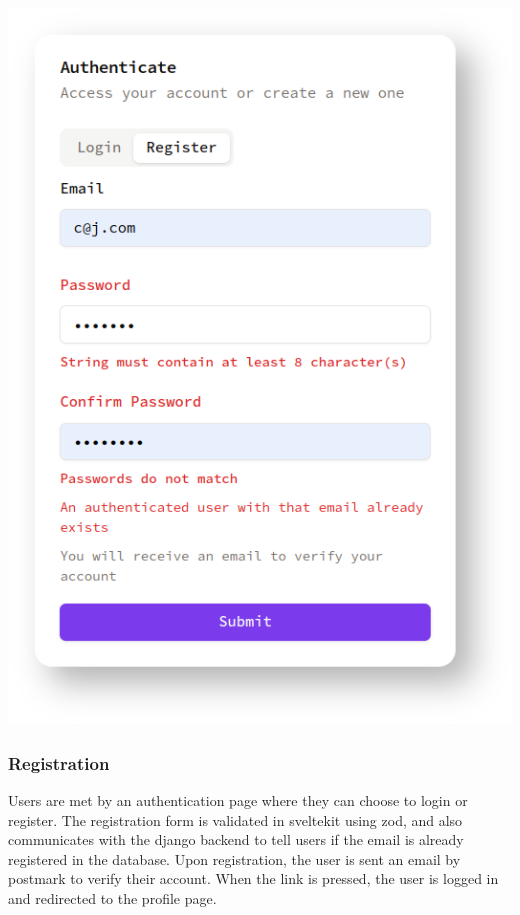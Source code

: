 \begin{minipage}{0.46\textwidth} %
\includegraphics[width=\textwidth]{images/register.png} %
\end{minipage}
\hfill
\begin{minipage}{0.5\textwidth} %
\subsubsection{Registration}
    Users are met by an authentication page where they can choose to login or register. The registration form is validated in sveltekit using zod, and also communicates with the django backend to tell users if the email is already registered in the database. Upon registration, the user is sent an email by postmark to verify their account. When the link is pressed, the user is logged in and redirected to the profile page.
\end{minipage}

